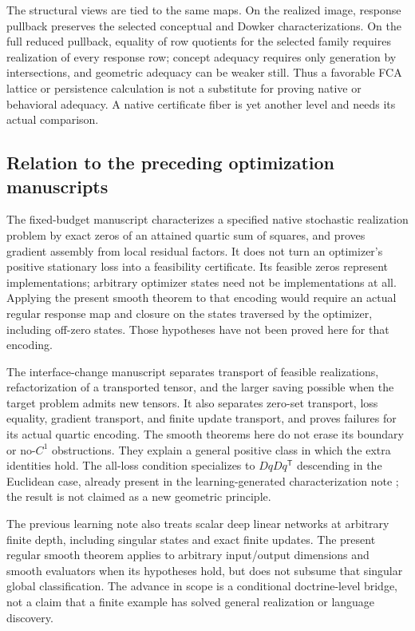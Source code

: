 \documentclass[11pt]{article}
\theoremstyle{definition}
\theoremstyle{remark}\newtheorem{remark}[theorem]{Remark}
\begin{document}
The structural views are tied to the same maps. On the realized image,
response pullback preserves the selected conceptual and Dowker
characterizations. On the full reduced pullback, equality of row quotients for the selected
family requires realization of every response row; concept adequacy
requires only generation by intersections, and geometric adequacy can be
weaker still. Thus a favorable FCA lattice or persistence calculation is
not a substitute for proving native or behavioral adequacy. A native
certificate fiber is yet another level and needs its actual comparison.

\subsection{Relation to the preceding optimization manuscripts}
The fixed-budget manuscript \cite{BudgetNote} characterizes a specified
native stochastic realization problem by exact zeros of an attained quartic
sum of squares, and proves gradient assembly from local residual factors.
It does not turn an optimizer's positive stationary loss into a feasibility
certificate. Its feasible zeros represent implementations; arbitrary
optimizer states need not be implementations at all. Applying the present
smooth theorem to that encoding would require an actual regular response
map and closure on the states traversed by the optimizer, including off-zero
states. Those hypotheses have not been proved here for that encoding.

The interface-change manuscript \cite{InterfaceNote} separates transport of
feasible realizations, refactorization of a transported tensor, and the larger
saving possible when the target problem admits new tensors. It also
separates zero-set transport, loss equality, gradient transport, and finite
update transport, and proves failures for its actual quartic encoding.
The smooth theorems here do not erase its boundary or no-$C^1$ obstructions.
They explain a general positive class in which the extra identities hold.
The all-loss condition specializes to $DqDq^{\mathsf T}$ descending in the
Euclidean case, already present in the learning-generated characterization
note \cite{LearningNote}; the result is not claimed as a new geometric
principle.

The previous learning note also treats scalar deep linear networks at
arbitrary finite depth, including singular states and exact finite updates.
The present regular smooth theorem applies to arbitrary input/output
dimensions and smooth evaluators when its hypotheses hold, but does not
subsume that singular global classification. The advance in scope is a
conditional doctrine-level bridge, not a claim that a finite example has
solved general realization or language discovery.
\end{document}

